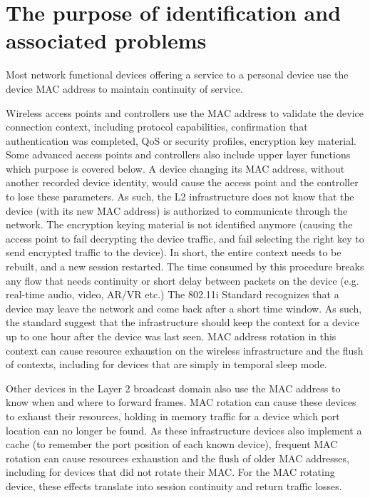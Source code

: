\documentclass[10pt]{article}
\begin{document}
{\section{The purpose of identification and associated problems}

Most network functional devices offering a service to a personal device use the device MAC address to maintain continuity of service.

Wireless access points and controllers use the MAC address to validate the device connection context, including protocol capabilities, confirmation that authentication was completed, QoS or security profiles, encryption key material. Some advanced access points and controllers also include upper layer functions which purpose is covered below. A device changing its MAC address, without another recorded device identity, would cause the access point and the controller to lose these parameters. As such, the L2 infrastructure does not know that the device (with its new MAC address) is authorized to communicate through the network. The encryption keying material is not identified anymore (causing the access point to fail decrypting the device traffic, and fail selecting the right key to send encrypted traffic to the device). In short, the entire context needs to be rebuilt, and a new session restarted. The time consumed by this procedure breaks any flow that needs continuity or short delay between packets on the device (e.g. real-time audio, video, AR/VR etc.) The 802.11i Standard recognizes that a device may leave the network and come back after a short time window. As such, the standard suggest that the infrastructure should keep the context for a device up to one hour after the device was last seen. MAC address rotation in this context can cause resource exhaustion on the wireless infrastructure and the flush of contexts, including for devices that are simply in temporal sleep mode.

Other devices in the Layer 2 broadcast domain also use the MAC address to know when and where to forward frames. MAC rotation can cause these devices to exhaust their resources, holding in memory traffic for a device which port location can no longer be found. As these infrastructure devices also implement a cache (to remember the port position of each known device), frequent MAC rotation can cause resources exhaustion and the flush of older MAC addresses, including for devices that did not rotate their MAC. For the MAC rotating device, these effects translate into session continuity and return traffic losses.

}
\end{document}
